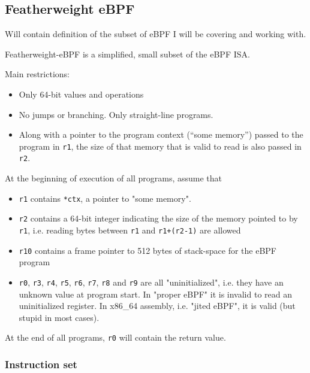 \subsection{Featherweight eBPF}
\label{subsec:featherweight_ebpf}
Will contain definition of the subset of eBPF I will be covering and working with.


Featherweight-eBPF is a simplified, small subset of the eBPF ISA.

Main restrictions:
\begin{itemize}
\item Only 64-bit values and operations
\item No jumps or branching. Only straight-line programs.
\item Along with a pointer to the program context (``some memory'') passed to the program in \texttt{r1}, the size of that memory that is valid to read is also passed in \texttt{r2}. 
\end{itemize}


At the beginning of execution of all programs, assume that
\begin{itemize}
\item \texttt{r1} contains \texttt{*ctx}, a pointer to "some memory".
\item \texttt{r2} contains a 64-bit integer indicating the size of the memory pointed to by \texttt{r1}, i.e. reading bytes between \texttt{r1} and \texttt{r1+(r2-1)} are allowed
\item \texttt{r10} contains a frame pointer to 512 bytes of stack-space for the eBPF program
\item \texttt{r0}, \texttt{r3}, \texttt{r4}, \texttt{r5}, \texttt{r6}, \texttt{r7}, \texttt{r8} and \texttt{r9} are all "uninitialized", i.e. they have an unknown value at program start. In "proper eBPF" it is invalid to read an uninitialized register. In x86\_64 assembly, i.e. "jited eBPF", it is valid (but stupid in most cases).

\end{itemize}

At the end of all programs, \texttt{r0} will contain the return value. 

\subsubsection*{Instruction set}


